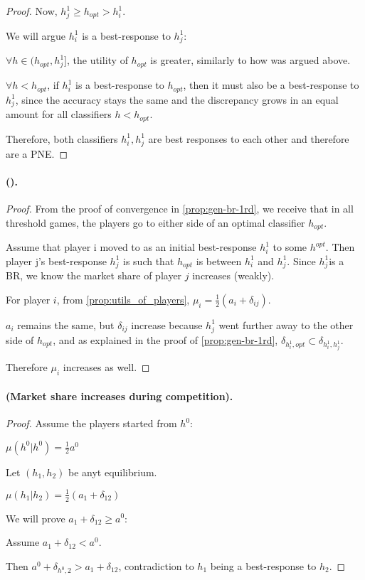 \begin{proof}
     Now,  $h_j^1 \ge h_{opt} > h_i^1$. 

     We will argue $h_i^1$ is a best-response to $h_j^1$:

     $\forall h \in (h_{opt}, h_j^1]$, the utility of $h_{opt}$ is greater, similarly to how was argued above.
     
     $ \forall h < h_{opt}$, if $h_i^1$ is a best-response to $h_{opt}$, then it must also be a best-response to $h_j^1$, since the accuracy stays the same and the discrepancy grows in an equal amount for all classifiers $h<h_{opt}$. 
     
     Therefore, both classifiers $h_i^1, h_j^1$ are best responses to each other and therefore are a PNE. 
\end{proof}

\paragraph{ ().}
\begin{proof}
From the proof of convergence in \cref{prop:gen-br-1rd}, we receive that in all threshold games, the players go to either side of an optimal classifier $h_{opt}$.

Assume that player i moved to as an initial best-response $h_i^1$ to some $h^{opt}$.
Then player j's best-response $h_j^1$  is such that $h_{opt}$ is between $h_i^1$ and $h_j^1$.
Since $h_j^1$is a BR, we know the market share of player $j$ increases (weakly).

For player $i$, from \cref{prop:utils_of_players}, $\mu_i = \frac{1}{2}(a_i +\delta_{ij})$.

$a_i$ remains the same, but $\delta_{ij}$ increase because $h_j^1$ went further away to the other side of $h_{opt}$, and as explained in the proof of \cref{prop:gen-br-1rd}, $\delta_{h_i^1, opt} \subset \delta_{h_i^1, h_j^1}$.

Therefore $\mu_i$ increases as well.

\end{proof}

\paragraph{ (Market share increases during competition).}
\begin{proof}
Assume the players started from $h^0$:

    $\mu(h^0|h^0) = \frac{1}{2}a^0$

Let $(h_1, h_2)$ be anyt equilibrium.

    $\mu(h_1| h_2) = \frac{1}{2}(a_1 + \delta_{12})$

    We will prove $a_1 + \delta_{12} \ge a^0$:

    Assume $a_1 + \delta_{12} < a^0$.

    Then $a ^0 + \delta_{h^0,2} > a_1 + \delta_{12} $, contradiction to $h_1$ being a best-response to $h_2$.
\end{proof}

